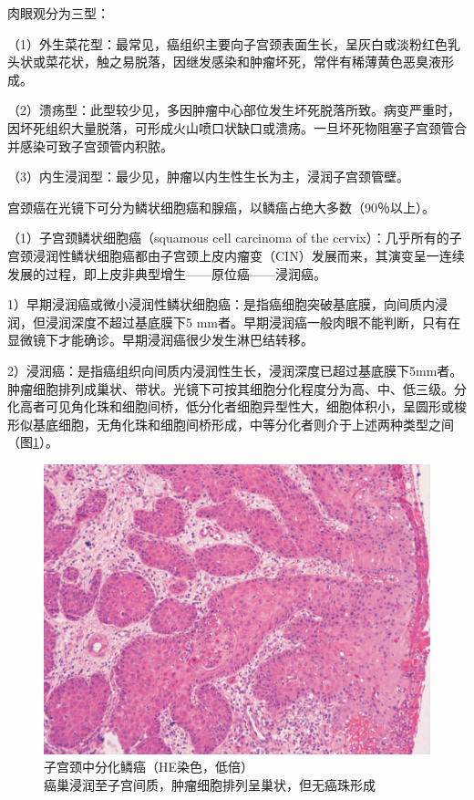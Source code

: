 肉眼观分为三型：

（1）外生菜花型：最常见，癌组织主要向子宫颈表面生长，呈灰白或淡粉红色乳头状或菜花状，触之易脱落，因继发感染和肿瘤坏死，常伴有稀薄黄色恶臭液形成。

（2）溃疡型：此型较少见，多因肿瘤中心部位发生坏死脱落所致。病变严重时，因坏死组织大量脱落，可形成火山喷口状缺口或溃疡。一旦坏死物阻塞子宫颈管合并感染可致子宫颈管内积脓。

（3）内生浸润型：最少见，肿瘤以内生性生长为主，浸润子宫颈管壁。

宫颈癌在光镜下可分为鳞状细胞癌和腺癌，以鳞癌占绝大多数（90％以上）。

（1）子宫颈鳞状细胞癌（squamous cell carcinoma of the
cervix）：几乎所有的子宫颈浸润性鳞状细胞癌都由子宫颈上皮内瘤变（CIN）发展而来，其演变呈一连续发展的过程，即上皮非典型增生------原位癌------浸润癌。

1）早期浸润癌或微小浸润性鳞状细胞癌：是指癌细胞突破基底膜，向间质内浸润，但浸润深度不超过基底膜下5
mm者。早期浸润癌一般肉眼不能判断，只有在显微镜下才能确诊。早期浸润癌很少发生淋巴结转移。

2）浸润癌：是指癌组织向间质内浸润性生长，浸润深度已超过基底膜下5mm者。肿瘤细胞排列成巢状、带状。光镜下可按其细胞分化程度分为高、中、低三级。分化高者可见角化珠和细胞间桥，低分化者细胞异型性大，细胞体积小，呈圆形或梭形似基底细胞，无角化珠和细胞间桥形成，中等分化者则介于上述两种类型之间（图\ref{fig11-3}）。

\begin{figure}[!htbp]
 \centering
 \includegraphics{./images/Image00187.jpg}
 \captionsetup{justification=centering}
 \caption{子宫颈中分化鳞癌（HE染色，低倍）\\ {\small 癌巢浸润至子宫间质，肿瘤细胞排列呈巢状，但无癌珠形成}}
\label{fig11-3}
  \end{figure}

